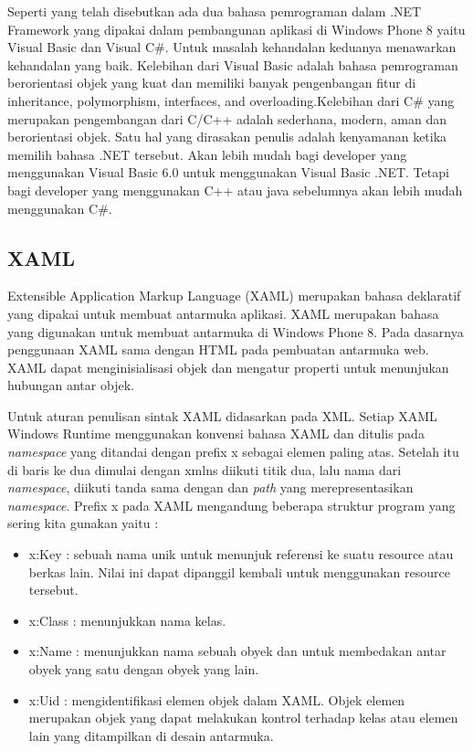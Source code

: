 \hspace{0.5cm} Seperti yang telah disebutkan ada dua bahasa pemrograman dalam .NET Framework yang dipakai dalam pembangunan aplikasi di Windows Phone 8 yaitu Visual Basic dan Visual C\#. \newline Untuk masalah kehandalan keduanya menawarkan kehandalan yang baik. Kelebihan dari Visual Basic adalah bahasa pemrograman berorientasi objek yang kuat dan memiliki banyak pengenbangan fitur di inheritance, polymorphism, interfaces, and overloading\cite{MSDN}.Kelebihan dari C\# yang merupakan pengembangan dari C/C++ adalah sederhana, modern, aman dan berorientasi objek\cite{MSDN}. Satu hal yang dirasakan penulis adalah kenyamanan ketika memilih bahasa .NET tersebut. Akan lebih mudah bagi developer yang menggunakan Visual Basic 6.0  untuk menggunakan Visual \newline Basic .NET. Tetapi bagi  developer yang menggunakan C++ atau java sebelumnya akan lebih mudah menggunakan C\#.

\subsection{XAML}
\label{subsec:XAML}
\hspace{0.5cm} Extensible Application Markup Language (XAML) merupakan bahasa deklaratif yang dipakai untuk membuat antarmuka aplikasi. XAML merupakan bahasa yang digunakan untuk membuat antarmuka di Windows Phone 8. Pada dasarnya penggunaan XAML sama dengan HTML pada pembuatan antarmuka web. XAML dapat menginisialisasi objek dan mengatur properti untuk menunjukan hubungan antar objek.

\hspace{0.5cm} Untuk aturan penulisan sintak XAML didasarkan pada XML. Setiap XAML Windows Runtime menggunakan konvensi bahasa XAML dan ditulis pada \textit{namespace} yang ditandai dengan prefix x sebagai elemen paling atas. Setelah itu di baris ke dua dimulai dengan xmlns diikuti titik dua, lalu nama dari \textit{namespace}, diikuti tanda sama dengan dan \textit{path} yang merepresentasikan \textit{namespace}.
Prefix x pada XAML mengandung beberapa struktur program yang sering kita gunakan yaitu :
\begin{itemize}
	\item x:Key : sebuah nama unik untuk menunjuk referensi ke suatu resource atau berkas lain. Nilai ini dapat dipanggil kembali untuk menggunakan resource tersebut.
	\item x:Class : menunjukkan nama kelas.
	\item x:Name : menunjukkan nama sebuah obyek dan untuk membedakan antar obyek yang satu dengan obyek yang lain.
	\item x:Uid : mengidentifikasi elemen objek dalam XAML. Objek elemen merupakan objek yang dapat melakukan kontrol terhadap kelas atau elemen lain yang ditampilkan di desain antarmuka.
\end{itemize}	

